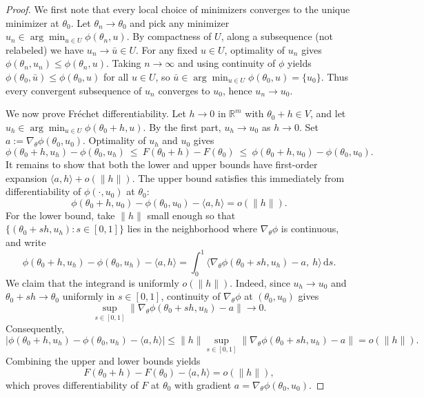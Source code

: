 \documentclass{article}
\theoremstyle{normaltheorem}
\newcommand{\R}{\mathbb{R}}
\begin{document}
	\begin{proof}
	We first note that every local choice of minimizers converges to the unique minimizer at \(\theta_0\).
	Let $\theta_n\to\theta_0$ and pick any minimizer $u_n\in\arg\min_{u\in U}\phi(\theta_n,u)$.
	By compactness of $U$, along a subsequence (not relabeled) we have $u_n\to \bar u\in U$.
	For any fixed $u\in U$, optimality of $u_n$ gives $\phi(\theta_n,u_n)\le \phi(\theta_n,u)$.
	Taking $n\to\infty$ and using continuity of $\phi$ yields $\phi(\theta_0,\bar u)\le \phi(\theta_0,u)$ for all $u\in U$,
	so $\bar u\in\arg\min_{u\in U}\phi(\theta_0,u)=\{u_0\}$.
	Thus every convergent subsequence of $u_n$ converges to $u_0$, hence $u_n\to u_0$.

	We now prove Fr\'echet differentiability. Let \(h\to0\) in \(\R^m\) with \(\theta_0+h\in V\), and let
	\(u_h\in\arg\min_{u\in U}\phi(\theta_0+h,u)\). By the first part, \(u_h\to u_0\) as \(h\to0\).
	Set \(a:=\nabla_\theta\phi(\theta_0,u_0)\). Optimality of \(u_h\) and \(u_0\) gives
	\[
	\phi(\theta_0+h,u_h)-\phi(\theta_0,u_h)
	\ \le\
	F(\theta_0+h)-F(\theta_0)
	\ \le\
	\phi(\theta_0+h,u_0)-\phi(\theta_0,u_0).
	\]
	It remains to show that both the lower and upper bounds have first-order expansion \(\langle a,h\rangle+o(\|h\|)\).
	The upper bound satisfies this immediately from differentiability of \(\phi(\cdot,u_0)\) at \(\theta_0\):
	\[
	\phi(\theta_0+h,u_0)-\phi(\theta_0,u_0)-\langle a,h\rangle=o(\|h\|).
	\]
	For the lower bound, take \(\|h\|\) small enough so that
	\(\{(\theta_0+s h,u_h):s\in[0,1]\}\) lies in the neighborhood where \(\nabla_\theta\phi\) is continuous, and write
	\[
	\phi(\theta_0+h,u_h)-\phi(\theta_0,u_h)-\langle a,h\rangle
	=
	\int_0^1
	\big\langle
	\nabla_\theta\phi(\theta_0+s h,u_h)-a,\ h
	\big\rangle\,\mathrm ds.
	\]
	We claim that the integrand is uniformly \(o(\|h\|)\). Indeed, since \(u_h\to u_0\) and
	\(\theta_0+s h\to\theta_0\) uniformly in \(s\in[0,1]\), continuity of \(\nabla_\theta\phi\) at
	\((\theta_0,u_0)\) gives
	\[
	\sup_{s\in[0,1]}
	\big\|
	\nabla_\theta\phi(\theta_0+s h,u_h)-a
	\big\|
	\to0.
	\]
	Consequently,
	\[
	\left|
	\phi(\theta_0+h,u_h)-\phi(\theta_0,u_h)-\langle a,h\rangle
	\right|
	\le
	\|h\|
	\sup_{s\in[0,1]}
	\big\|
	\nabla_\theta\phi(\theta_0+s h,u_h)-a
	\big\|
	=o(\|h\|).
	\]
	Combining the upper and lower bounds yields
	\[
	F(\theta_0+h)-F(\theta_0)-\langle a,h\rangle=o(\|h\|),
	\]
	which proves differentiability of \(F\) at \(\theta_0\) with gradient \(a=\nabla_\theta\phi(\theta_0,u_0)\).
	\end{proof}
\end{document}
